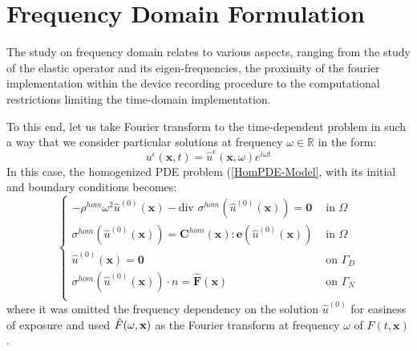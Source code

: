 \section{Frequency Domain Formulation}
The study on frequency domain relates to various aspects, ranging from the study of the elastic operator and its eigen-frequencies, the proximity of the fourier implementation within the device recording procedure to the computational restrictions limiting the time-domain implementation. 

To this end, let us take Fourier transform to the time-dependent problem in such a way that we consider particular solutions at frequency $\omega \in \mathbb{R}$ in the form:
\begin{equation}
    \label{FreqAnsatz}
    u^{\epsilon}(\mathbf{x},t) = \hat{u}^{\epsilon}(\mathbf{x},\omega) e^{i \omega t}
\end{equation}
In this case, the homogenized PDE problem (\ref{HomPDE-Model}, with its initial and boundary conditions becomes:
\begin{equation}
    \label{VectorPDE-Freq}
    \left \{
    \begin{array}{cc}
        -\rho^{hom} \omega^2 \hat{u}^{(0)}(\mathbf{x}) - \text{div }\sigma^{hom} (\hat{u}^{(0)}(\mathbf{x}))=\mathbf{0}  & \text{ in }  \Omega \\
        \sigma^{hom} (\hat{u}^{(0)}(\mathbf{x})) = \mathbf{C}^{hom}(\mathbf{x}): \mathbf{e} (\hat{u}^{(0)}(\mathbf{x})) & \text{ in } \Omega  \\
        \hat{u}^{(0)}(\mathbf{x}) = \mathbf{0} & \text{ on } \Gamma_D\\
        \sigma^{hom} (\hat{u}^{(0)}(\mathbf{x}))\cdot n = \hat{\mathbf{F}}(\mathbf{x}) & \text{ on } \Gamma_N \\
    \end{array}
    \right .
\end{equation}
where it was omitted the frequency dependency on the solution $\hat{u}^{(0)}$ for easiness of exposure and used $\Hat{F}(\omega, \mathbf{x})$ as the Fourier transform at frequency $\omega$ of $F(t, \mathbf{x})$.
